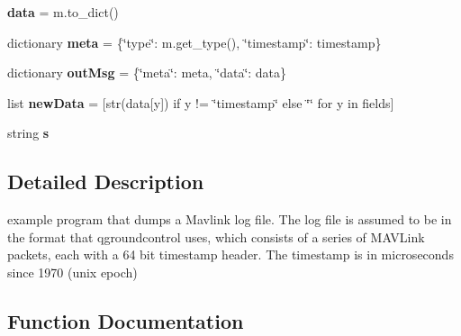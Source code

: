 \begin{DoxyCompactItemize}
\mbox{\label{namespacepymavlink_1_1tools_1_1mavlogdump_a85115ce0f3935727ee1721b7e8b8befe}} 
{\bfseries data} = m.\+to\+\_\+dict()
\item 
\mbox{\label{namespacepymavlink_1_1tools_1_1mavlogdump_ad3723a3a312a13fed34c390355d09a3d}} 
dictionary {\bfseries meta} = \{\char`\"{}type\char`\"{}\+: m.\+get\+\_\+type(), \char`\"{}timestamp\char`\"{}\+: timestamp\}
\item 
\mbox{\label{namespacepymavlink_1_1tools_1_1mavlogdump_a4702d8d4cc541614f5245654255814b7}} 
dictionary {\bfseries out\+Msg} = \{\char`\"{}meta\char`\"{}\+: meta, \char`\"{}data\char`\"{}\+: data\}
\item 
\mbox{\label{namespacepymavlink_1_1tools_1_1mavlogdump_a1479908be3a298d998f53d46ec01ccb2}} 
list {\bfseries new\+Data} = \mbox{[}str(data\mbox{[}y\mbox{]}) if y != \char`\"{}timestamp\char`\"{} else \char`\"{}\char`\"{} for y in fields\mbox{]}
\item 
string {\bfseries s}
\end{DoxyCompactItemize}


\subsection{Detailed Description}
\begin{DoxyVerb}example program that dumps a Mavlink log file. The log file is
assumed to be in the format that qgroundcontrol uses, which consists
of a series of MAVLink packets, each with a 64 bit timestamp
header. The timestamp is in microseconds since 1970 (unix epoch)
\end{DoxyVerb}
 

\subsection{Function Documentation}
\mbox{\label{namespacepymavlink_1_1tools_1_1mavlogdump_a6d6e4b627922cd7882784716f7f8db1f}} 
